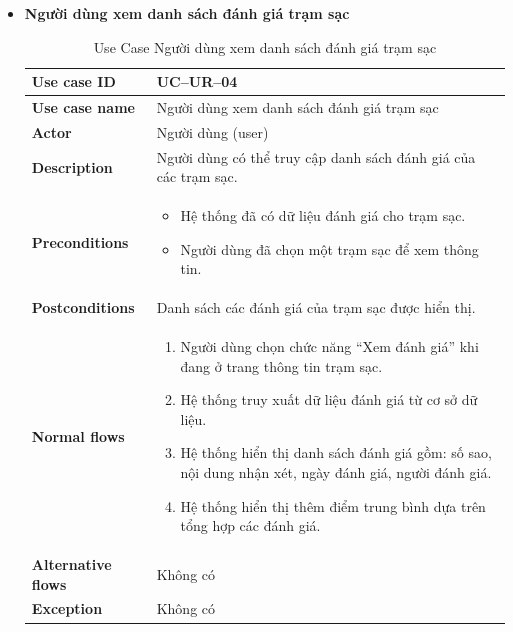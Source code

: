 \begin{itemize}
\item \textbf{Người dùng xem danh sách đánh giá trạm sạc}
\begin{longtable}{|m{}|m{}|}
          \caption{Use Case Người dùng xem danh sách đánh giá trạm sạc} \\
  \hline
  \textbf{Use case ID} & UC--UR--04 \\
  \hline
  \textbf{Use case name} & Người dùng xem danh sách đánh giá trạm sạc \\
  \hline
  \textbf{Actor} & Người dùng (user) \\
  \hline
  \textbf{Description} & Người dùng có thể truy cập danh sách đánh giá của các trạm sạc. \\
  \hline
  \textbf{Preconditions} &
  \begin{itemize}
    \item Hệ thống đã có dữ liệu đánh giá cho trạm sạc.
    \item Người dùng đã chọn một trạm sạc để xem thông tin.
  \end{itemize}\\
  \hline
  \textbf{Postconditions} & Danh sách các đánh giá của trạm sạc được hiển thị. \\
  \hline
  \textbf{Normal flows} &
  \begin{enumerate}[label=\arabic*.]
    \item Người dùng chọn chức năng “Xem đánh giá” khi đang ở trang thông tin trạm sạc.
    \item Hệ thống truy xuất dữ liệu đánh giá từ cơ sở dữ liệu.
    \item Hệ thống hiển thị danh sách đánh giá gồm: số sao, nội dung nhận xét, ngày đánh giá, người đánh giá.
    \item Hệ thống hiển thị thêm điểm trung bình dựa trên tổng hợp các đánh giá.
  \end{enumerate}\\
  \hline
  \textbf{Alternative flows} & Không có\\
  \hline
  \textbf{Exception} & Không có\\
  \hline
  \end{longtable}


\end{itemize}
